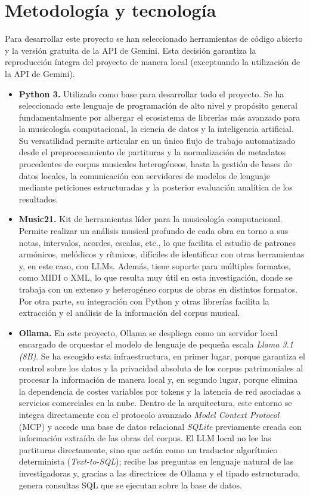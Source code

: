 \section{Metodología y tecnología}
Para desarrollar este proyecto se han seleccionado herramientas de código abierto y la versión gratuita de la API de Gemini. Esta decisión garantiza la reproducción íntegra del proyecto de manera local (exceptuando la utilización de la API de Gemini).
\begin{itemize}
\item \textbf{Python 3.} Utilizado como base para desarrollar todo el proyecto. Se ha seleccionado este lenguaje de programación de alto nivel y propósito general fundamentalmente por albergar el ecosistema de librerías más avanzado para la musicología computacional, la ciencia de datos y la inteligencia artificial. Su versatilidad permite articular en un único flujo de trabajo automatizado desde el preprocesamiento de partituras y la normalización de metadatos procedentes de corpus musicales heterogéneos, hasta la gestión de bases de datos locales, la comunicación con servidores de modelos de lenguaje mediante peticiones estructuradas y la posterior evaluación analítica de los resultados.
\item \textbf{Music21.} Kit de herramientas líder para la musicología computacional. Permite realizar un análisis musical profundo de cada obra en torno a sus notas, intervalos, acordes, escalas, etc., lo que facilita el estudio de patrones armónicos, melódicos y rítmicos, difíciles de identificar con otras herramientas y, en este caso, con LLMs. Además, tiene soporte para múltiples formatos, como MIDI o XML, lo que resulta muy útil en esta investigación, donde se trabaja con un extenso y heterogéneo corpus de obras en distintos formatos. Por otra parte, su integración con Python y otras librerías facilita la extracción y el análisis de la información del corpus musical.
\item \textbf{Ollama.} En este proyecto, Ollama se despliega como un servidor local encargado de orquestar el modelo de lenguaje de pequeña escala \textit{Llama 3.1 (8B)}. Se ha escogido esta infraestructura, en primer lugar, porque garantiza el control sobre los datos y la privacidad absoluta de los corpus patrimoniales al procesar la información de manera local y, en segundo lugar, porque elimina la dependencia de costes variables por tokens y la latencia de red asociadas a servicios comerciales en la nube. Dentro de la arquitectura, este entorno se integra directamente con el protocolo avanzado \textit{Model Context Protocol} (MCP) y accede una base de datos relacional \textit{SQLite} previamente creada con información extraída de las obras del corpus. El LLM local no lee las partituras directamente, sino que actúa como un traductor algorítmico determinista (\textit{Text-to-SQL}); recibe las preguntas en lenguaje natural de las investigadoras y, gracias a las directrices de Ollama y el tipado estructurado, genera consultas SQL que se ejecutan sobre la base de datos. 

\end{itemize}
